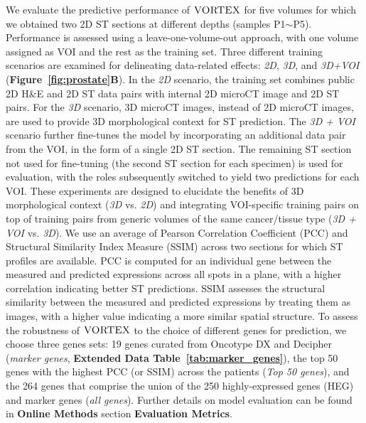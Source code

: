 We evaluate the predictive performance of $\textsc{VORTEX}$ for five volumes for which we obtained two 2D ST sections at different depths (samples P1$\sim$P5). Performance is assessed using a leave-one-volume-out approach, with one volume assigned as VOI and the rest as the training set. Three different training scenarios are examined for delineating data-related effects: \textit{2D}, \textit{3D}, and \textit{3D+VOI} (\textbf{Figure~\ref{fig:prostate}B}). In the \textit{2D} scenario, the training set combines public 2D H\&E and 2D ST data pairs with internal 2D microCT image and 2D ST pairs. For the \textit{3D} scenario, 3D microCT images, instead of 2D microCT images, are used to provide 3D morphological context for ST prediction. The \textit{3D + VOI} scenario further fine-tunes the model by incorporating an additional data pair from the VOI, in the form of a single 2D ST section. The remaining ST section not used for fine-tuning (the second ST section for each specimen) is used for evaluation, with the roles subsequently switched to yield two predictions for each VOI. These experiments are designed to elucidate the benefits of 3D morphological context (\textit{3D} vs. \textit{2D}) and integrating VOI-specific training pairs on top of training pairs from generic volumes of the same cancer/tissue type (\textit{3D + VOI} vs. \textit{3D}).
We use an average of Pearson Correlation Coefficient (PCC) and Structural Similarity Index Measure (SSIM) across two sections for which ST profiles are available. PCC is computed for an individual gene between the measured and predicted expressions across all spots in a plane, with a higher correlation indicating better ST predictions. SSIM assesses the structural similarity between the measured and predicted expressions by treating them as images, with a higher value indicating a more similar spatial structure\cite{wang2004image, zhang2024inferring, wang2025benchmark}.
To assess the robustness of $\textsc{VORTEX}$ to the choice of different genes for prediction, we choose three genes sets: 19 genes curated from Oncotype DX\cite{klein201417, cullen2015biopsy} and Decipher\cite{klein2016decipher} (\textit{marker genes}, \textbf{Extended Data Table~\ref{tab:marker_genes}}), the top 50 genes with the highest PCC (or SSIM) across the patients (\textit{Top 50 genes}), and the 264 genes that comprise the union of the 250 highly-expressed genes (HEG) and marker genes (\textit{all genes}).
Further details on model evaluation can be found in \textbf{Online Methods} section \textbf{Evaluation Metrics}.

